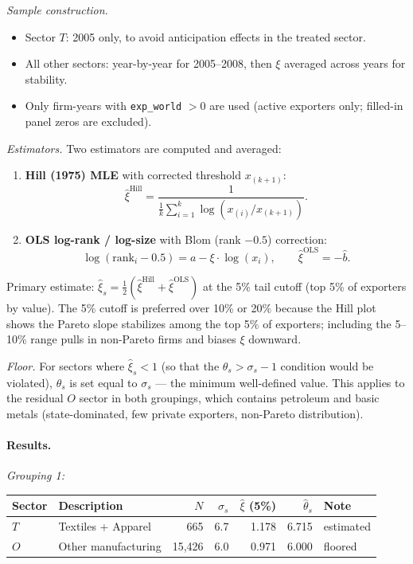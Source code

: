 \documentclass[12pt]{article}
\begin{document}
\medskip
\noindent\textit{Sample construction.}
\begin{itemize}
  \item Sector $T$: 2005 only, to avoid anticipation effects in the treated
        sector.
  \item All other sectors: year-by-year for 2005--2008, then $\xi$ averaged
        across years for stability.
  \item Only firm-years with \texttt{exp\_world} $> 0$ are used (active
        exporters only; filled-in panel zeros are excluded).
\end{itemize}

\noindent\textit{Estimators.} Two estimators are computed and averaged:
\begin{enumerate}
  \item \textbf{Hill (1975) MLE} with corrected threshold $x_{(k+1)}$:
        \[
        \hat\xi^{\text{Hill}} =
        \frac{1}{\frac{1}{k}\sum_{i=1}^{k} \log(x_{(i)}/x_{(k+1)})}.
        \]
  \item \textbf{OLS log-rank / log-size} with Blom (rank $- 0.5$) correction:
        \[
        \log(\text{rank}_i - 0.5) = a - \xi \cdot \log(x_i),
        \qquad \hat\xi^{\text{OLS}} = -\hat b.
        \]
\end{enumerate}
Primary estimate: $\hat\xi_s = \frac{1}{2}(\hat\xi^{\text{Hill}} +
\hat\xi^{\text{OLS}})$ at the 5\% tail cutoff (top 5\% of exporters by
value). The 5\% cutoff is preferred over 10\% or 20\% because the Hill
plot shows the Pareto slope stabilizes among the top 5\% of exporters;
including the 5--10\% range pulls in non-Pareto firms and biases $\xi$
downward.

\noindent\textit{Floor.} For sectors where $\hat\xi_s < 1$ (so that the
$\theta_s > \sigma_s - 1$ condition would be violated), $\theta_s$ is set
equal to $\sigma_s$ --- the minimum well-defined value. This applies to the
residual $O$ sector in both groupings, which contains petroleum and basic
metals (state-dominated, few private exporters, non-Pareto distribution).

\paragraph{Results.}

\medskip
\noindent\textit{Grouping 1:}
\begin{center}
\begin{tabular}{llrrrrl}
\toprule
Sector & Description & $N$ & $\sigma_s$ & $\hat\xi$ (5\%) &
$\hat\theta_s$ & Note \\
\midrule
$T$ & Textiles + Apparel  & 665   & 6.7 & 1.178 & 6.715 & estimated \\
$O$ & Other manufacturing & 15,426 & 6.0 & 0.971 & 6.000 & floored \\
\bottomrule
\end{tabular}
\end{center}
\end{document}
